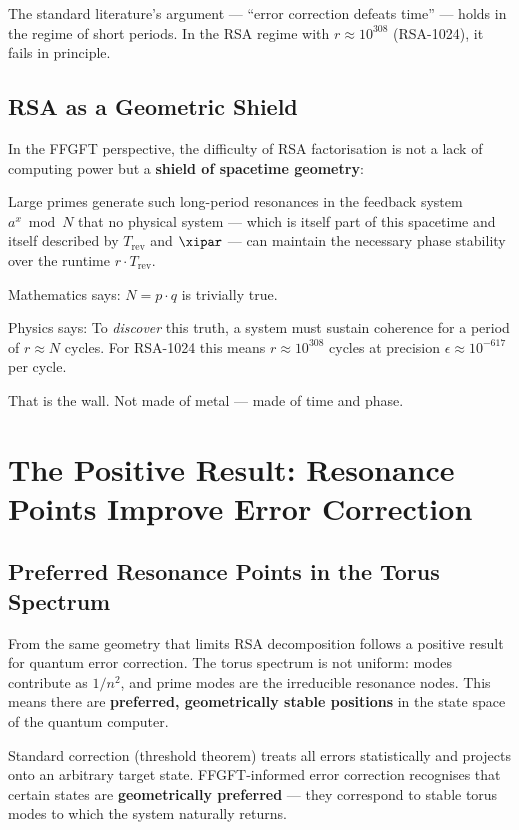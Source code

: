 The standard literature's argument — ``error correction defeats time'' — holds
in the regime of short periods. In the RSA regime with $r \approx 10^{308}$
(RSA-1024), it fails in principle.

\subsection{RSA as a Geometric Shield}

In the FFGFT perspective, the difficulty of RSA factorisation is not a lack of
computing power but a \textbf{shield of spacetime geometry}:

Large primes generate such long-period resonances in the feedback system
$a^x \bmod N$ that no physical system — which is itself part of this spacetime and
itself described by $T_\text{rev}$ and $\xipar$ — can maintain the necessary phase
stability over the runtime $r \cdot T_\text{rev}$.

\begin{conclusionBox}
Mathematics says: $N = p \cdot q$ is trivially true.

Physics says: To \emph{discover} this truth, a system must sustain coherence for a
period of $r \approx N$ cycles. For RSA-1024 this means $r \approx 10^{308}$ cycles
at precision $\epsilon \approx 10^{-617}$ per cycle.

That is the wall. Not made of metal — made of time and phase.
\end{conclusionBox}


\section{The Positive Result: Resonance Points Improve Error Correction}

\subsection{Preferred Resonance Points in the Torus Spectrum}

From the same geometry that limits RSA decomposition follows a positive result for
quantum error correction. The torus spectrum is not uniform: modes contribute as
$1/n^2$, and prime modes are the irreducible resonance nodes. This means there are
\textbf{preferred, geometrically stable positions} in the state space of the quantum
computer.

Standard correction (threshold theorem) treats all errors statistically and projects
onto an arbitrary target state. FFGFT-informed error correction recognises that
certain states are \textbf{geometrically preferred} — they correspond to stable
torus modes to which the system naturally returns.

